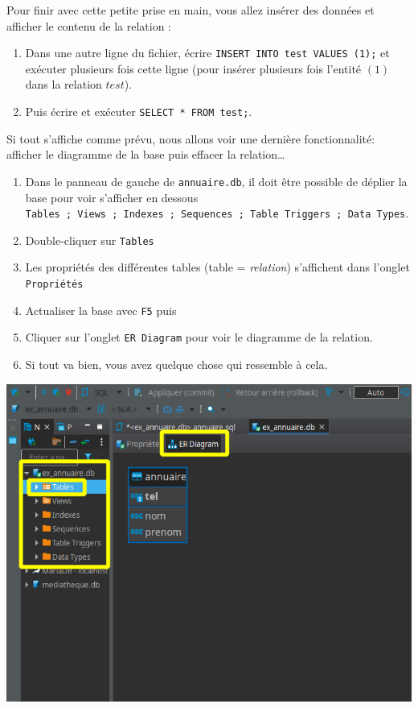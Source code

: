 \documentclass[a4paper,17pt]{extarticle}
\providecommand{\tightlist}{%
      \setlength{\itemsep}{0pt}\setlength{\parskip}{0pt}}
\begin{document}
Pour finir avec cette petite prise en main, vous allez insérer des
données et afficher le contenu de la relation :

\begin{enumerate}
\def\labelenumi{\arabic{enumi}.}
\setcounter{enumi}{7}
\tightlist
\item
  Dans une autre ligne du fichier, écrire
  \texttt{INSERT\ INTO\ test\ VALUES\ (1);} et exécuter plusieurs fois
  cette ligne (pour insérer plusieurs fois l'entité \((1)\) dans la
  relation \(test\)).
\item
  Puis écrire et exécuter \texttt{SELECT\ *\ FROM\ test;}.
\end{enumerate}

Si tout s'affiche comme prévu, nous allons voir une dernière
fonctionnalité: afficher le diagramme de la base puis effacer la
relation\ldots{}

\begin{enumerate}
\def\labelenumi{\arabic{enumi}.}
\setcounter{enumi}{9}
\tightlist
\item
  Dans le panneau de gauche de \texttt{annuaire.db}, il doit être
  possible de déplier la base pour voir s'afficher en dessous
  \texttt{Tables\ ;\ Views\ ;\ Indexes\ ;\ Sequences\ ;\ Table\ Triggers\ ;\ Data\ Types}.
\item
  Double-cliquer sur \texttt{Tables}
\item
  Les propriétés des différentes tables (table = \emph{relation})
  s'affichent dans l'onglet \texttt{Propriétés}
\item
  Actualiser la base avec \texttt{F5} puis
\item
  Cliquer sur l'onglet \texttt{ER\ Diagram} pour voir le diagramme de la
  relation.
\item
  Si tout va bien, vous avez quelque chose qui ressemble à cela.
\end{enumerate}

    \includegraphics{./img-dbeaver.png}
\end{document}
